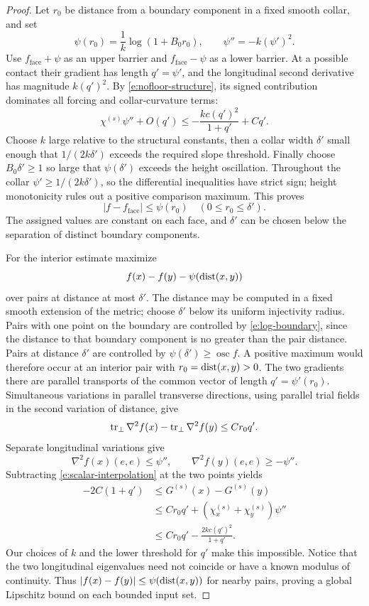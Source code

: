 \begin{proof}
Let $r_0$ be distance from a boundary component in a fixed smooth
collar, and set
\begin{equation}\label{e:log-barrier}
 \psi(r_0)=\frac1k\log(1+B_0r_0),
 \qquad \psi''=-k(\psi')^2.
\end{equation}
Use $f_{\mathrm{face}}+\psi$ as an upper barrier and
$f_{\mathrm{face}}-\psi$ as a lower barrier.  At a possible contact their
gradient has length $q'=\psi'$, and the longitudinal second derivative
has magnitude $k(q')^2$.  By \eqref{e:nofloor-structure}, its signed
contribution dominates all forcing and collar-curvature terms:
\[
 \chi^{(s)}\psi''+O(q')
       \le-\frac{kc(q')^2}{1+q'}+Cq'.
\]
Choose $k$ large relative to the structural constants, then a collar
width $\delta'$ small enough that $1/(2k\delta')$ exceeds the required
slope threshold.  Finally choose $B_0\delta'\ge1$ so large that
$\psi(\delta')$ exceeds the height oscillation.  Throughout the collar
$\psi'\ge1/(2k\delta')$, so the differential inequalities have strict
sign; height monotonicity rules out a positive comparison maximum.
This proves
\begin{equation}\label{e:log-boundary}
 |f-f_{\mathrm{face}}|\le\psi(r_0)
                 \quad(0\le r_0\le\delta').
\end{equation}
The assigned values are constant on each face, and $\delta'$ can be
chosen below the separation of distinct boundary components.

For the interior estimate maximize
\[
 f(x)-f(y)-\psi(\operatorname{dist}(x,y))
\]
over pairs at distance at most $\delta'$.  The distance may be
computed in a fixed smooth extension of the metric; choose
$\delta'$ below its uniform injectivity radius.  Pairs with one point
on the boundary are controlled by \eqref{e:log-boundary}, since the
distance to that boundary component is no greater than the pair
distance.  Pairs at distance $\delta'$ are controlled by
$\psi(\delta')\ge\operatorname{osc}f$.  A positive maximum would
therefore occur at an interior pair with $r_0=\operatorname{dist}(x,y)>0$.
The two gradients there are parallel transports of the common vector
of length $q'=\psi'(r_0)$.  Simultaneous variations in parallel
transverse directions, using parallel trial fields in the second
variation of distance, give
\[
 \operatorname{tr}_\perp\nabla^2f(x)-\operatorname{tr}_\perp\nabla^2f(y)
                                      \le Cr_0q'.
\]
Separate longitudinal variations give
\[
 \nabla^2f(x)(e,e)\le\psi'',\qquad
 \nabla^2f(y)(e,e)\ge-\psi''.
\]
Subtracting \eqref{e:scalar-interpolation} at the two points yields
\begin{align*}
 -2C(1+q')
 &\le G^{(s)}(x)-G^{(s)}(y)\\
 &\le Cr_0q'+(\chi_x^{(s)}+\chi_y^{(s)})\psi''\\
 &\le Cr_0q'-\frac{2kc(q')^2}{1+q'}.
\end{align*}
Our choices of $k$ and the lower threshold for $q'$ make this
impossible.  Notice that the two longitudinal eigenvalues need not
coincide or have a known modulus of continuity.  Thus
$|f(x)-f(y)|\le\psi(\operatorname{dist}(x,y))$ for nearby pairs, proving a global
Lipschitz bound on each bounded input set.


\end{proof}
